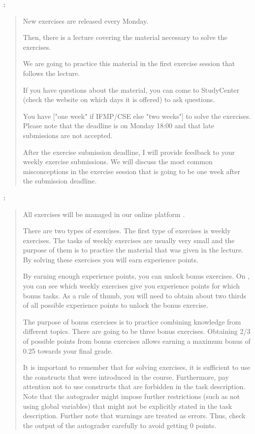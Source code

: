 :
\begin{quote}
    New exercises are released every Monday.

    Then, there is a lecture covering the material necessary to solve
    the exercises.

    We are going to practice this material in the first exercise session
    that follows the lecture.

    If you have questions about the material, you can come to StudyCenter 
    (check the website on which days it is offered) to ask questions.

    You have ["one week" if IFMP/CSE else "two weeks"] to solve the exercises. Please note that the
    deadline is on Monday 18:00 and that late submissions are not accepted.

    After the exercise submission deadline, I will provide feedback to
    your weekly exercise submissions. We will discuss the most common
    misconceptions in the exercise session that is going to be one week
    after the submission deadline.
\end{quote}

\quest


:
\begin{quote}
    All exercises will be managed in our online platform \Expert{}.

    There are two types of exercises. The first type of exercises is
    weekly exercises. The tasks of weekly exercises are usually very
    small and the purpose of them is to practice the material that was
    given in the lecture. By solving these exercises you will earn
    experience points.

    By earning enough experience points, you can unlock bonus exercises.
    On \Expert{}, you can see which weekly exercises give you experience
    points for which bonus tasks. As a rule of thumb, you will need to
    obtain about two thirds of all possible experience points to unlock
    the bonus exercise.

    The purpose of bonus exercises is to practice combining knowledge
    from different topics. There are going to be three bonus exercises.
    Obtaining 2/3 of possible points from bonus exercises allows earning
    a maximum bonus of 0.25 towards your final grade.

    It is important to remember that for solving exercises, it is 
    sufficient to use the constructs that were introduced in the course. 
    Furthermore, pay attention not to use constructs that are forbidden 
    in the task description. Note that the autograder might impose 
    further restrictions (such as not using global variables) that might 
    not be explicitly stated in the task description. Further note that 
    warnings are treated as errors. Thus, check the output of the autograder 
    carefully to avoid getting 0 points.
\end{quote}

